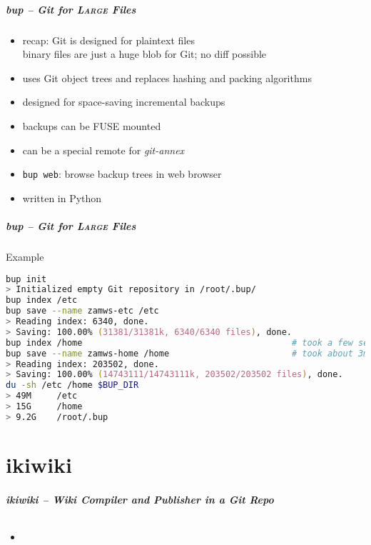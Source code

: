 \documentclass[english,hyperref={pdfpagelabels=false},aspectratio=169]{beamer}
\begin{document}
\begin{frame}[label=bup]
  \frametitle{bup -- Git for \textsc{Large} Files}
  \begin{itemize}
    \item recap: Git is designed for plaintext files\\
      {\scriptsize binary files are just a huge blob for Git; no diff possible}
    \item uses Git object trees and replaces hashing and packing algorithms
    \item designed for space-saving incremental backups
    \item backups can be FUSE mounted
    \item can be a special remote for \textit{git-annex}
    \item \texttt{bup web}: browse backup trees in web browser
    \item written in Python
  \end{itemize}
\end{frame}

\begin{frame}[fragile]
  \frametitle{bup -- Git for \textsc{Large} Files}
  \begin{block}{Example}
    \vspace{-0.75em}
    \begin{lstlisting}[language=zsh]
bup init
> Initialized empty Git repository in /root/.bup/
bup index /etc
bup save --name zamws-etc /etc
> Reading index: 6340, done.
> Saving: 100.00% (31381/31381k, 6340/6340 files), done.
bup index /home                                         # took a few seconds
bup save --name zamws-home /home                        # took about 3min
> Reading index: 203502, done.
> Saving: 100.00% (14743111/14743111k, 203502/203502 files), done.
du -sh /etc /home $BUP_DIR
> 49M     /etc
> 15G     /home
> 9.2G    /root/.bup
    \end{lstlisting}
    \vspace{-0.75em}
  \end{block}
\end{frame}


\part{ikiwiki}
\makepart

\begin{frame}[label=ikiwiki]
  \frametitle{ikiwiki -- Wiki Compiler and Publisher in a Git Repo}
  \framesubtitle{}
  \begin{itemize}
    \item 
  \end{itemize}
\end{frame}
\end{document}
